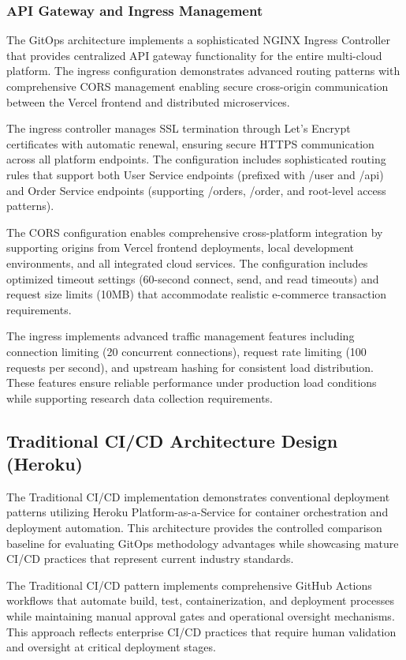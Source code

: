 \subsubsection{API Gateway and Ingress Management}

The GitOps architecture implements a sophisticated NGINX Ingress Controller that provides centralized API gateway functionality for the entire multi-cloud platform. The ingress configuration demonstrates advanced routing patterns with comprehensive CORS management enabling secure cross-origin communication between the Vercel frontend and distributed microservices.

The ingress controller manages SSL termination through Let's Encrypt certificates with automatic renewal, ensuring secure HTTPS communication across all platform endpoints. The configuration includes sophisticated routing rules that support both User Service endpoints (prefixed with /user and /api) and Order Service endpoints (supporting /orders, /order, and root-level access patterns).

The CORS configuration enables comprehensive cross-platform integration by supporting origins from Vercel frontend deployments, local development environments, and all integrated cloud services. The configuration includes optimized timeout settings (60-second connect, send, and read timeouts) and request size limits (10MB) that accommodate realistic e-commerce transaction requirements.

The ingress implements advanced traffic management features including connection limiting (20 concurrent connections), request rate limiting (100 requests per second), and upstream hashing for consistent load distribution. These features ensure reliable performance under production load conditions while supporting research data collection requirements.

\subsection{Traditional CI/CD Architecture Design (Heroku)}

The Traditional CI/CD implementation demonstrates conventional deployment patterns utilizing Heroku Platform-as-a-Service for container orchestration and deployment automation. This architecture provides the controlled comparison baseline for evaluating GitOps methodology advantages while showcasing mature CI/CD practices that represent current industry standards.

The Traditional CI/CD pattern implements comprehensive GitHub Actions workflows that automate build, test, containerization, and deployment processes while maintaining manual approval gates and operational oversight mechanisms. This approach reflects enterprise CI/CD practices that require human validation and oversight at critical deployment stages.

